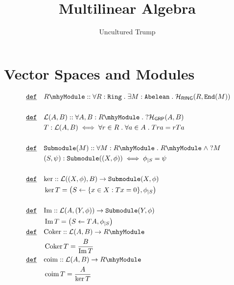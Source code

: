 \documentclass[12pt]{article}
\title{Multilinear Algebra }
\author{Uncultured Trump}
\DeclareMathOperator*{\im}{\mathrm{Im}}
\DeclareMathOperator*{\coker}{\mathrm{Coker}}
\DeclareMathOperator*{\coim}{\mathrm{coim}}
\renewcommand{\.}{\; . \;}
\newcommand{\De}{\underline{\mathtt{def}} \quad}
\newcommand{\module}[1]{{#1} \mhy \mathtt{Module}}
\newcommand{\submodule}[1]{\mathtt{Submodule}(#1)}
\newcommand{\linear}[1]{\mathcal{L}(#1)}
\newcommand{\Morph}[3]{\mathcal{H}_{#1}(#2,#3)}
\newcommand{\ring}{\mathtt{Ring}}
\newcommand{\RING}{\mathsf{RING}}
\newcommand{\GRP}{\mathsf{GRP} }
\newcommand{\End}{\mathtt{End}}
\newcommand{\abel}{\mathtt{Abelean}}
\begin{document}
\maketitle
\section{Vector Spaces and Modules}
\begin{align*}
\De & \module{R} :: \forall R :  \ring \. \exists M : \abel \. \Morph{\RING}{R}{\End(M)} \\
\\
\De & \linear{A,B} :: \forall A,B : \module{R} \. ? \Morph{\GRP}{A}{B} \\
	&  T : \linear{A,B} \iff \forall r \in R \. \forall a \in A \. Tra = rTa \\
	\\
\De & \submodule{M} :: \forall M : \module{R} \. \module{R} \; \wedge \; ?M \\
	& (S, \psi) : \submodule{(X,\phi)} \iff   \phi_{\vert S} = \psi \\ \\
\De & {\ker} ::	 \linear{(X,\phi),B} \to \submodule{X,\phi} \\
	& \ker T = \big( S \leftarrow \{ x \in X : Tx = 0  \}, \phi_{\vert S} \big) \\ \\
\De & {\im} ::	 \linear{ A,(Y,\phi)} \to \submodule{Y,\phi} \\
	& \im T = \big( S \leftarrow TA, \phi_{\vert S} \big) \\ \
\De & {\coker} :: \linear{A, B} \to \module{R} \\
	& \coker T = \frac{B}{\im T} \\
\De & {\coim} :: \linear{A, B} \to \module{R} \\
	& \coim T = \frac{A}{\ker T}
\end{align*} 
\newpage
\end{document}
